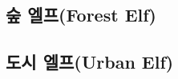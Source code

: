 \documentclass{report}
\begin{document}
	\subsection{숲 엘프(Forest Elf)}
		
		
	\subsection{도시 엘프(Urban Elf)}
		
\end{document}
